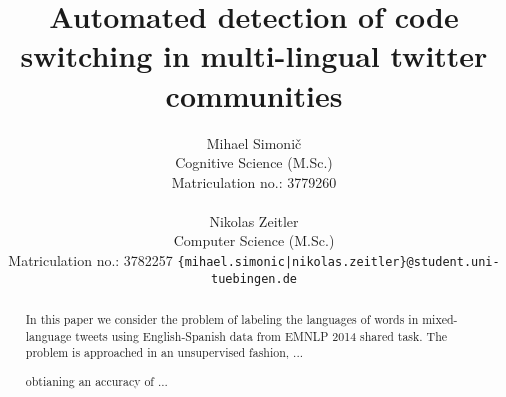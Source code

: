 \documentclass[11pt]{article}
\title{ Automated detection of code switching in multi-lingual twitter communities }
\author{ Mihael Simonič \\
  Cognitive Science (M.Sc.) \\
  Matriculation no.: 3779260 \\
  \\\And
  Nikolas Zeitler \\
  Computer Science (M.Sc.) \\
  Matriculation no.: 3782257
  \ANd 
  {\tt \{mihael.simonic|nikolas.zeitler\}@student.uni-tuebingen.de}
  }
\date{}
\begin{document}
\maketitle
\begin{abstract}
  In this paper we consider the problem of labeling the languages of words in mixed-language tweets using English-Spanish data from EMNLP 2014 shared task. The problem is approached in an unsupervised fashion, ...

obtianing an accuracy of ... 
\end{abstract}











\end{document}
